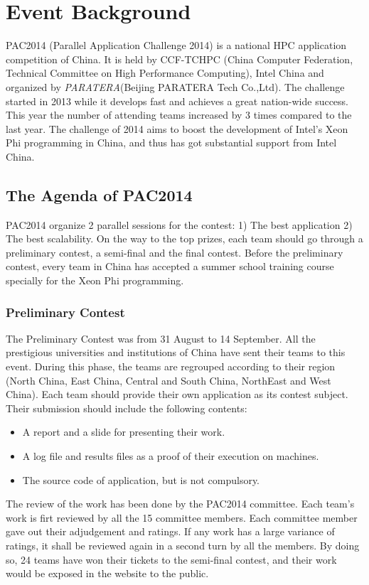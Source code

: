 \chapter{Event Background}
\label{chp:1}

PAC2014 (Parallel Application Challenge 2014) is a national HPC application competition of China. It is held by CCF-TCHPC (China Computer Federation,
Technical Committee on High Performance Computing), Intel China and organized by \textsl{PARATERA}(Beijing PARATERA Tech Co.,Ltd). The challenge 
started in 2013 while it develops fast and achieves a great nation-wide success. This year the number of attending teams increased by 3 times compared to the last year. 
The challenge of 2014 aims to boost the development of Intel's Xeon Phi programming in China, and thus has got substantial 
support from Intel China. 

\section{The Agenda of PAC2014} %
\label{sec:AgendaPAC2014}

PAC2014 organize 2 parallel sessions for the contest: 1) The best application 2) The best scalability. 
On the way to the top prizes, each team should go through a preliminary contest, a semi-final and the final contest. 
Before the preliminary contest, every team in China has accepted a summer school training course specially for the Xeon Phi programming.  

\subsection{Preliminary Contest} %
\label{sub:Preliminary}
The Preliminary Contest was from 31 August to 14 September. 
All the prestigious universities and institutions of China have sent their teams to this event. 
During this phase, the teams are regrouped according to their region (North China, East China, Central and South China, NorthEast and West China). 
Each team should provide their own application as its contest subject. Their submission should include the following contents: 
\begin{itemize}
	\item A report and a slide for presenting their work.
	\item A log file and results files as a proof of their execution on machines.
	\item The source code of application, but is not compulsory.
\end{itemize}
The review of the work has been done by the PAC2014 committee. Each team's work is firt reviewed by all the 15 committee members. Each committee member
gave out their adjudgement and ratings. If any work has a large variance of ratings, it shall be reviewed again in a second turn by all the members. 
By doing so, 24 teams have won their tickets to the semi-final contest, and their work would be exposed in the website to the public. 

